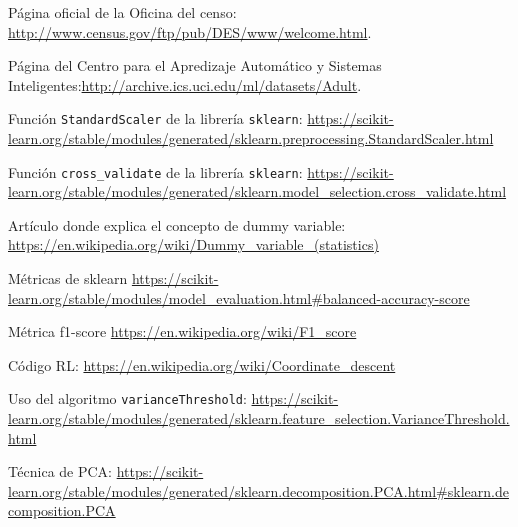 \documentclass[11pt,a4paper]{article}
\begin{document}
\newpage
\begin{thebibliography}{9}
Página oficial de la Oficina del censo: \url{http://www.census.gov/ftp/pub/DES/www/welcome.html}.

Página del Centro para el Apredizaje Automático y Sistemas Inteligentes:\url{http://archive.ics.uci.edu/ml/datasets/Adult}.

Función \texttt{StandardScaler} de la librería \texttt{sklearn}: \url{https://scikit-learn.org/stable/modules/generated/sklearn.preprocessing.StandardScaler.html}

Función \texttt{cross\_validate} de la librería \texttt{sklearn}:
\url{https://scikit-learn.org/stable/modules/generated/sklearn.model_selection.cross_validate.html}

Artículo donde explica el concepto de dummy variable: \url{https://en.wikipedia.org/wiki/Dummy_variable_(statistics)}

Métricas de sklearn \url{https://scikit-learn.org/stable/modules/model_evaluation.html#balanced-accuracy-score}


Métrica f1-score \url{https://en.wikipedia.org/wiki/F1_score}


Código RL: \url{https://en.wikipedia.org/wiki/Coordinate_descent}


Uso del algoritmo \texttt{varianceThreshold}: \url{https://scikit-learn.org/stable/modules/generated/sklearn.feature_selection.VarianceThreshold.html}

Técnica de PCA: 
\url{https://scikit-learn.org/stable/modules/generated/sklearn.decomposition.PCA.html#sklearn.decomposition.PCA}

\end{thebibliography}
\end{document}
